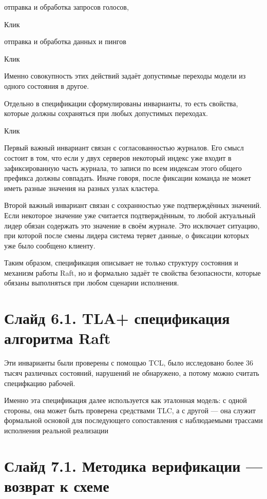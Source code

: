 \documentclass[12pt,a4paper]{article}
\begin{document}
отправка и обработка запросов голосов,

Клик

отправка и обработка данных и пингов

Клик

Именно совокупность этих действий задаёт допустимые переходы модели из
одного состояния в другое.

Отдельно в спецификации сформулированы инварианты, то есть свойства,
которые должны сохраняться при любых допустимых переходах.

Клик

Первый важный инвариант связан с согласованностью журналов. Его смысл
состоит в том, что если у двух серверов некоторый индекс уже входит в
зафиксированную часть журнала, то записи по всем индексам этого общего
префикса должны совпадать. Иначе говоря, после фиксации команда не
может иметь разные значения на разных узлах кластера.

Второй важный инвариант связан с сохранностью уже подтверждённых
значений. Если некоторое значение уже считается подтверждённым, то
любой актуальный лидер обязан содержать это значение в своём журнале.
Это исключает ситуацию, при которой после смены лидера система теряет
данные, о фиксации которых уже было сообщено клиенту.

Таким образом, спецификация описывает не только структуру состояния и
механизм работы Raft, но и формально задаёт те свойства безопасности,
которые обязаны выполняться при любом сценарии исполнения.

\section*{Слайд 6.1. TLA+ спецификация алгоритма Raft}

Эти инварианты были проверены с помощью TCL, было исследовано более 36 тысяч
различных состояний, нарушений не обнаружено, а потому можно считать
специфкацию рабочей.

Именно эта спецификация далее используется как эталонная модель:
с одной стороны, она может быть проверена средствами TLC, а с другой —
она служит формальной основой для последующего сопоставления с
наблюдаемыми трассами исполнения реальной реализации

\section*{Слайд 7.1. Методика верификации --- возврат к схеме}
\end{document}

